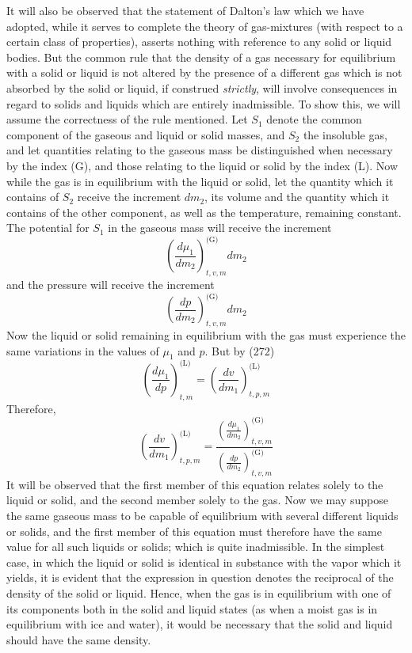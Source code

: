 \documentclass[12pt]{memoir}
\begin{document}
It will also be observed that the statement of Dalton's law which we have adopted, while it serves to complete the theory of gas-mixtures (with respect to a certain class of properties), asserts nothing with reference to any solid or liquid bodies. But the common rule that the density of a gas necessary for equilibrium with a solid or liquid is not altered by the presence of a different gas which is not absorbed by the solid or liquid, if construed \textit{strictly}, will involve consequences in regard to solids and liquids which are entirely inadmissible. To show this, we will assume the correctness of the rule mentioned. Let $S_1$ denote the common component of the gaseous and liquid or solid masses, and $S_2$ the insoluble gas, and let quantities relating to the gaseous mass be distinguished when necessary by the index (G), and those relating to the liquid or solid by the index (L). Now while the gas is in equilibrium with the liquid or solid, let the quantity which it contains of $S_2$ receive the increment $dm_2$, its volume and the quantity which it contains of the other component, as well as the temperature, remaining constant. The potential for $S_1$ in the gaseous mass will receive the increment
$$ \left( \frac{d\mu_1}{dm_2} \right)_{t,v,m}^{\text{(G)}}  dm_2 $$
and the pressure will receive the increment
$$ \left( \frac{d p}{d m_2} \right)_{t,v,m}^{\text{(G)}}  dm_2 $$
Now the liquid or solid remaining in equilibrium with the gas must experience the same variations in the values of $\mu_1$ and $p$. But by (272)
$$   \left( \frac{d\mu_1}{d p} \right)_{t,m}^{\text{(L)}}    =
  \left( \frac{d v}{d m_1} \right)_{t,p,m}^{\text{(L)}}     $$
Therefore,
$$ \left( \frac{d v}{d m_1} \right)_{t,p,m}^{\text{(L)}}  =
\frac{\left( \frac{d\mu_1}{dm_2} \right)_{t,v,m}^{\text{(G)}} }{\left( \frac{d p}{dm_2} \right)_{t,v,m}^{\text{(G)}} }   $$
It will be observed that the first member of this equation relates solely to the liquid or solid, and the second member solely to the gas. Now we may suppose the same gaseous mass to be capable of equilibrium with several different liquids or solids, and the first member of this equation must therefore have the same value for all such liquids or solids; which is quite inadmissible. In the simplest case, in which the liquid or solid is identical in substance with the vapor which it yields, it is evident that the expression in question denotes the reciprocal of the density of the solid or liquid. Hence, when the gas is in equilibrium with one of its components both in the solid and liquid states (as when a moist gas is in equilibrium with ice and water), it would be necessary that the solid and liquid should have the same density.
\end{document}
